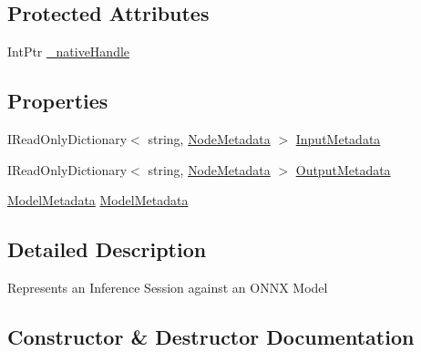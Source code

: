 \subsection*{Protected Attributes}
\begin{DoxyCompactItemize}
\item 
Int\+Ptr \mbox{\hyperlink{classMicrosoft_1_1ML_1_1OnnxRuntime_1_1InferenceSession_af21004085b4d236f7ca28829367b2d86}{\+\_\+native\+Handle}}
\end{DoxyCompactItemize}
\subsection*{Properties}
\begin{DoxyCompactItemize}
\item 
I\+Read\+Only\+Dictionary$<$ string, \mbox{\hyperlink{structMicrosoft_1_1ML_1_1OnnxRuntime_1_1NodeMetadata}{Node\+Metadata}} $>$ \mbox{\hyperlink{classMicrosoft_1_1ML_1_1OnnxRuntime_1_1InferenceSession_a4dafe4054b706966d971eb953e0624b3}{Input\+Metadata}}
\item 
I\+Read\+Only\+Dictionary$<$ string, \mbox{\hyperlink{structMicrosoft_1_1ML_1_1OnnxRuntime_1_1NodeMetadata}{Node\+Metadata}} $>$ \mbox{\hyperlink{classMicrosoft_1_1ML_1_1OnnxRuntime_1_1InferenceSession_a6ec51749bbb6f364bb9af050c956066f}{Output\+Metadata}}
\item 
\mbox{\hyperlink{structMicrosoft_1_1ML_1_1OnnxRuntime_1_1ModelMetadata}{Model\+Metadata}} \mbox{\hyperlink{classMicrosoft_1_1ML_1_1OnnxRuntime_1_1InferenceSession_a55b76db5cd70a96614cc69ed6fa098c3}{Model\+Metadata}}
\end{DoxyCompactItemize}


\subsection{Detailed Description}
Represents an Inference Session against an O\+N\+NX Model 



\subsection{Constructor \& Destructor Documentation}
\mbox{\label{classMicrosoft_1_1ML_1_1OnnxRuntime_1_1InferenceSession_ad3981d9f3b4323653e5718a26af2a8c8}} 
